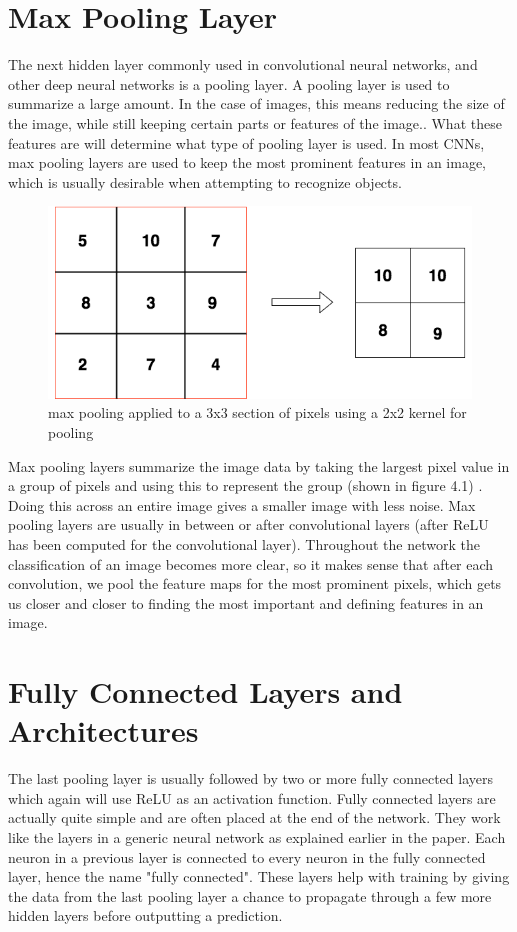 \documentclass[12pt]{report} %
\begin{document}
 \section{Max Pooling Layer}

	The next hidden layer commonly used in convolutional neural networks, and other deep neural networks is a pooling layer. A pooling layer is used to summarize a large amount. In the case of images, this means reducing the size of the image, while still keeping certain parts or features of the image.\cite{aurelienMachineLearning}. What these features are will determine what type of pooling layer is used. In most CNNs, max pooling layers are used to keep the most prominent features in an image, which is usually desirable when attempting to recognize objects. 
\begin{figure}
\centering
\includegraphics[width=7in]{max_pooling}
\caption{max pooling applied to a 3x3 section of pixels using a 2x2 kernel for pooling}
\end{figure}		
	Max pooling layers summarize the image data by taking the largest pixel value in a group of pixels and using this to represent the group (shown in figure 4.1) . Doing this across an entire image gives a smaller image with less noise. Max pooling layers are usually in between or after convolutional layers (after ReLU has been computed for the convolutional layer). Throughout the network the classification of an image becomes more clear, so it makes sense that after each convolution, we pool the feature maps for the most prominent pixels, which gets us closer and closer to finding the most important and defining features in an image. 

 \section{Fully Connected Layers and Architectures}
	
	The last pooling layer is usually followed by two or more fully connected layers which again will use ReLU as an activation function. Fully connected layers are actually quite simple and are often placed at the end of the network. They work like the layers in a generic neural network as explained earlier in the paper. Each neuron in a previous layer is connected to every neuron in the fully connected layer, hence the name "fully connected"\cite{LeonardoFully}. These layers help with training by giving the data from the last pooling layer a chance to propagate through a few more hidden layers before outputting a prediction. 
	
\end{document}
